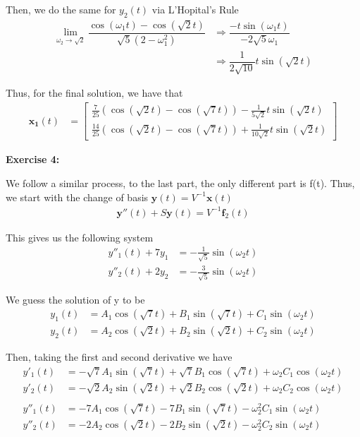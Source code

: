 \documentclass[12pt]{article}
\begin{document}
\begin{itemize}
          Then, we do the same for $y_2(t)$ via L'Hopital's Rule
          \begin{align*}
              \lim_{\omega_2 \rightarrow{} \sqrt{2}} \dfrac{\cos(\omega_{1}t) -\cos(\sqrt{2}t)}{\sqrt{5}(2-\omega_1^2)} & \Rightarrow{} \dfrac{-t \sin(\omega_1t)}{-2\sqrt{5}\omega_1} \\
                                                                                                                        & \Rightarrow{} \dfrac{1}{2\sqrt{10}} t\sin(\sqrt{2}t)
          \end{align*}

          Thus, for the final solution, we have that
          \begin{align*}
              \mathbf{x_1}(t) & = \begin{bmatrix}
                                      \frac{7}{25}(\cos(\sqrt{2}t) -\cos(\sqrt{7}t)) - \frac{1}{5\sqrt{2}} t\sin(\sqrt{2}t) \\
                                      \frac{14}{25}(\cos(\sqrt{2}t) -\cos(\sqrt{7}t)) + \frac{1}{10\sqrt{2}} t\sin(\sqrt{2}t)
                                  \end{bmatrix}
          \end{align*}
\end{itemize}

\noindent{}\textbf{Exercise 4:}

We follow a similar process, to the last part, the only different part is f(t). Thus, we start with the change of basis $\mathbf{y}(t) = V^{-1}\mathbf{x}(t)$
\begin{align*}
    \mathbf{y}''(t) + S\mathbf{y}(t) = V^{-1}\mathbf{f}_2(t)
\end{align*}

This gives us the following system
\begin{align*}
    y''_1(t) + 7y_1 & = -\frac{1}{\sqrt{5}} \sin(\omega_2t) \\
    y''_2(t) + 2y_2 & = -\frac{3}{\sqrt{5}} \sin(\omega_2t)
\end{align*}

We guess the solution of y to be
\begin{align*}
    y_1(t) & = A_1\cos(\sqrt{7}t) + B_1\sin(\sqrt{7}t) + C_1 \sin(\omega_{2}t) \\
    y_2(t) & = A_2\cos(\sqrt{2}t) + B_2\sin(\sqrt{2}t) + C_2 \sin(\omega_{2}t)
\end{align*}

Then, taking the first and second derivative we have
\begin{align*}
    y'_1(t)  & = -\sqrt{7}A_1\sin(\sqrt{7}t) + \sqrt{7}B_1\cos(\sqrt{7}t) + \omega_{2} C_1 \cos(\omega_{2}t) \\
    y'_2(t)  & = -\sqrt{2}A_2\sin(\sqrt{2}t) + \sqrt{2}B_2\cos(\sqrt{2}t) + \omega_{2} C_2 \cos(\omega_{2}t) \\\\
    y''_1(t) & = -7A_1\cos(\sqrt{7}t) - 7B_1\sin(\sqrt{7}t) - \omega_{2}^2 C_1 \sin(\omega_{2}t)             \\
    y''_2(t) & = -2A_2\cos(\sqrt{2}t) - 2B_2\sin(\sqrt{2}t) - \omega_{2}^2 C_2 \sin(\omega_{2}t)
\end{align*}
\end{document}
